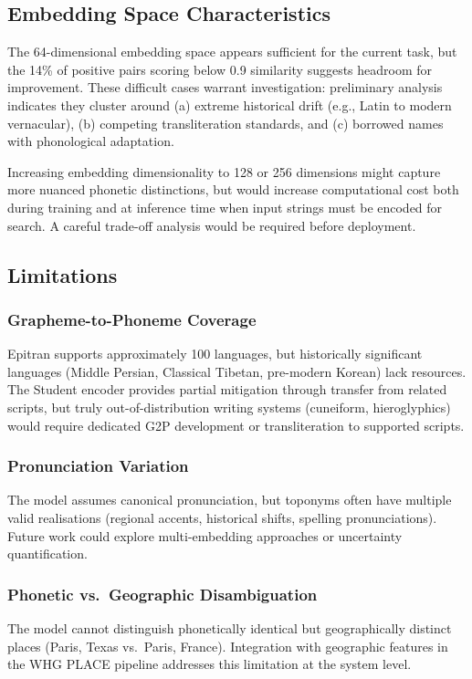 \documentclass[11pt]{article}
\begin{document}
    \subsection{Embedding Space Characteristics}

    The 64-dimensional embedding space appears sufficient for the current task,
    but the 14\% of positive pairs scoring below 0.9 similarity suggests
    headroom for improvement. These difficult cases warrant investigation:
    preliminary analysis indicates they cluster around (a) extreme historical
    drift (e.g., Latin to modern vernacular), (b) competing transliteration
    standards, and (c) borrowed names with phonological adaptation.

    Increasing embedding dimensionality to 128 or 256 dimensions might capture
    more nuanced phonetic distinctions, but would increase computational cost
    both during training and at inference time when input strings must be
    encoded for search. A careful trade-off analysis would be required before
    deployment.

    \subsection{Limitations}

    \subsubsection{Grapheme-to-Phoneme Coverage}
    Epitran supports approximately 100 languages, but historically significant
    languages (Middle Persian, Classical Tibetan, pre-modern Korean) lack
    resources. The Student encoder provides partial mitigation through transfer
    from related scripts, but truly out-of-distribution writing systems
    (cuneiform, hieroglyphics) would require dedicated G2P development or
    transliteration to supported scripts.

    \subsubsection{Pronunciation Variation}
    The model assumes canonical pronunciation, but toponyms often have multiple
    valid realisations (regional accents, historical shifts, spelling
    pronunciations). Future work could explore multi-embedding approaches or
    uncertainty quantification.

    \subsubsection{Phonetic vs.\ Geographic Disambiguation}
    The model cannot distinguish phonetically identical but geographically
    distinct places (Paris, Texas vs.\ Paris, France). Integration with
    geographic features in the WHG PLACE pipeline addresses this limitation
    at the system level.
\end{document}
